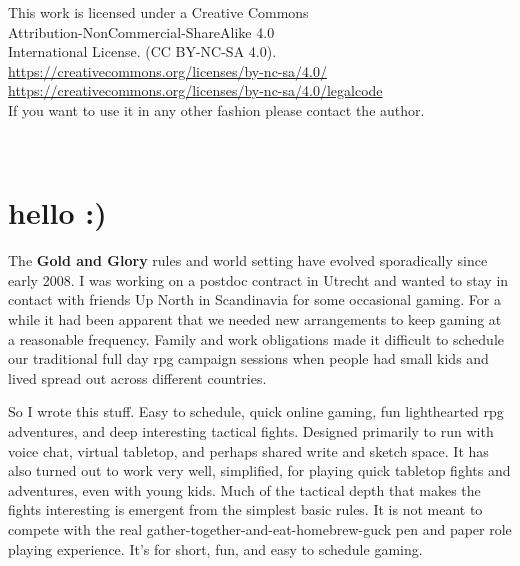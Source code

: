 



\clearpage
\thispagestyle{empty}
\raggedbottom

\vsmall
\noindent
This work is licensed under a Creative Commons \\
Attribution-NonCommercial-ShareAlike 4.0 \\
International License. (CC BY-NC-SA 4.0).\\
\url{https://creativecommons.org/licenses/by-nc-sa/4.0/} \\
\url{https://creativecommons.org/licenses/by-nc-sa/4.0/legalcode} \\
If you want to use it in any other fashion please contact the author.

\


\normalsize





\cleardoublepage                   %
\thispagestyle{empty}
\raggedbottom

\chapter*{hello :)}

The \textbf{Gold and Glory} rules and world setting have evolved sporadically since early 2008. I was working on a postdoc contract in Utrecht and wanted to stay in contact with friends Up North in Scandinavia for some occasional gaming.
For a while it had been apparent that we needed new arrangements to keep gaming at a reasonable frequency. Family and work obligations made it difficult to schedule our traditional full day rpg campaign sessions when people had small kids and lived spread out across different countries.

So I wrote this stuff. Easy to schedule, quick online gaming, fun lighthearted rpg adventures, and deep interesting tactical fights. Designed primarily to run with voice chat, virtual tabletop, and perhaps shared write and sketch space. It has also turned out to work very well, simplified, for playing quick tabletop fights and adventures, even with young kids. Much of the tactical depth that makes the fights interesting is emergent from the simplest basic rules.
It is not meant to compete with the real gather-together-and-eat-homebrew-guck pen and paper role playing experience. It's for short, fun, and easy to schedule gaming.

